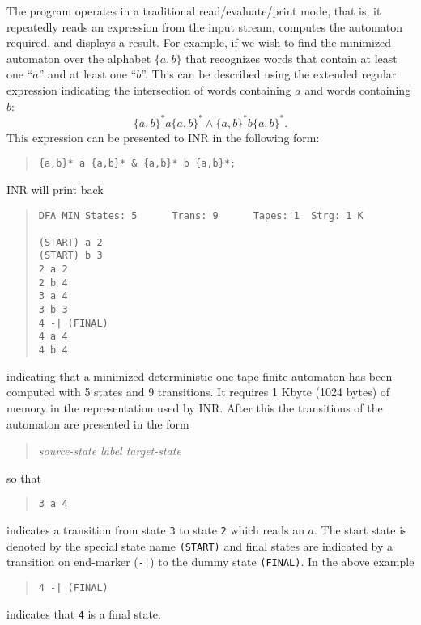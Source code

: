 The program operates in a traditional read/evaluate/print mode, that is, it
repeatedly reads an expression from the input stream, computes the
automaton required, and displays a result.
For example, if we wish to find the minimized automaton over the alphabet
$\{a,b\}$ that recognizes words that contain at least one ``$a$'' and at least
one ``$b$''.
This can be described using the extended regular expression indicating the
intersection of words containing $a$ and words containing $b$:
$$\{a,b\}^*a\{a,b\}^* \wedge \{a,b\}^*b\{a,b\}^*.$$
This expression can be presented to INR in the following form:
\begin{quote}
\begin{verbatim}
{a,b}* a {a,b}* & {a,b}* b {a,b}*;
\end{verbatim}
\end{quote}
INR will print back
\begin{quote}
\begin{verbatim}
DFA MIN States: 5      Trans: 9      Tapes: 1  Strg: 1 K

(START) a 2
(START) b 3
2 a 2
2 b 4
3 a 4
3 b 3
4 -| (FINAL)
4 a 4
4 b 4
\end{verbatim}
\end{quote}
indicating that a minimized deterministic one-tape finite automaton has been
computed with 5 states and 9 transitions.
It requires 1 Kbyte (1024 bytes) of memory in the representation used by INR.
After this the transitions of the automaton are presented in the form
\begin{quote}
{\it source-state \qquad label \qquad target-state}
\end{quote}
so that
\begin{quote}
\begin{verbatim}
3 a 4
\end{verbatim}
\end{quote}
indicates a transition from state {\tt 3} to state {\tt 2} which reads an $a$.
The start state is denoted by the special state name {\tt (START)} and
final states are indicated by a transition on end-marker ({\tt -|}) to the
dummy state {\tt (FINAL)}.
In the above example
\begin{quote}
\begin{verbatim}
4 -| (FINAL)
\end{verbatim}
\end{quote}
indicates that {\tt 4} is a final state.

